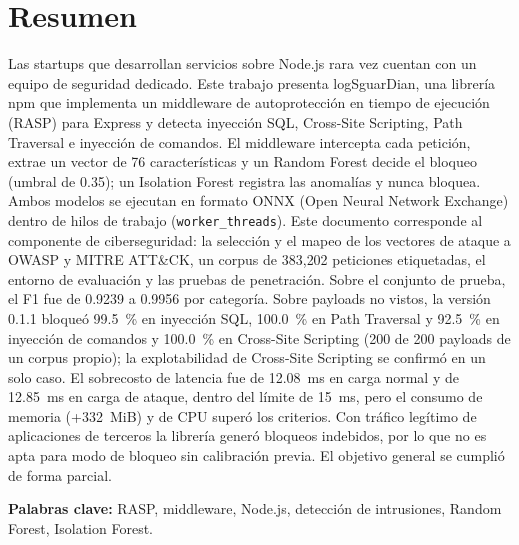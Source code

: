 \ifdefined\modoensamble
\else
	
	\chapter*{Resumen}
\fi

Las startups que desarrollan servicios sobre Node.js rara vez cuentan con un equipo de seguridad dedicado. Este trabajo presenta logSguarDian, una librería npm que implementa un middleware de autoprotección en tiempo de ejecución (RASP) para Express y detecta inyección SQL, Cross-Site Scripting, Path Traversal e inyección de comandos. El middleware intercepta cada petición, extrae un vector de 76 características y un Random Forest decide el bloqueo (umbral de 0.35); un Isolation Forest registra las anomalías y nunca bloquea. Ambos modelos se ejecutan en formato ONNX (Open Neural Network Exchange) dentro de hilos de trabajo (\texttt{worker\_threads}). Este documento corresponde al componente de ciberseguridad: la selección y el mapeo de los vectores de ataque a OWASP y MITRE ATT\&CK, un corpus de 383{,}202 peticiones etiquetadas, el entorno de evaluación y las pruebas de penetración. Sobre el conjunto de prueba, el F1 fue de 0.9239 a 0.9956 por categoría. Sobre payloads no vistos, la versión 0.1.1 bloqueó 99.5~\% en inyección SQL, 100.0~\% en Path Traversal y 92.5~\% en inyección de comandos y 100.0~\% en Cross-Site Scripting (200 de 200 payloads de un corpus propio); la explotabilidad de Cross-Site Scripting se confirmó en un solo caso. El sobrecosto de latencia fue de 12.08~ms en carga normal y de 12.85~ms en carga de ataque, dentro del límite de 15~ms, pero el consumo de memoria (+332~MiB) y de CPU superó los criterios. Con tráfico legítimo de aplicaciones de terceros la librería generó bloqueos indebidos, por lo que no es apta para modo de bloqueo sin calibración previa. El objetivo general se cumplió de forma parcial.

\medskip
\noindent\textbf{Palabras clave:} RASP, middleware, Node.js, detección de intrusiones, Random Forest, Isolation Forest.

\ifdefined\modoensamble
\else
	
\fi
